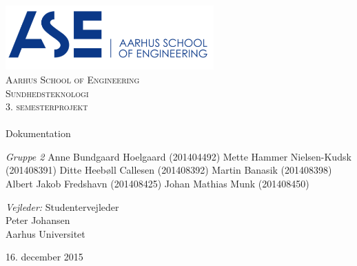 \begin{titlingpage}
\begin{center}

~ \\[3cm]

\includegraphics[width=0.6\textwidth]{figurer/ASE}~\\[1cm]

\textsc{\LARGE Aarhus School of Engineering}\\[1.5cm]

\textsc{\Large Sundhedsteknologi}\\
\textsc{\Large 3. semesterprojekt}\\[0.5cm]

\noindent\makebox[\linewidth]{\rule{\textwidth}{0.4pt}}\\
[0.5cm]{\Huge Dokumentation}
\noindent\makebox[\linewidth]{\rule{\textwidth}{0.4pt}}

\end{center}

\textit{Gruppe 2} \newline
Anne Bundgaard Hoelgaard \tab(201404492) \newline
Mette Hammer Nielsen-Kudsk  \tab(201408391) \newline	
Ditte Heebøll Callesen \tab(201408392) \newline
Martin Banasik  \tab(201408398) \newline	
Albert Jakob Fredshavn \tab(201408425) \newline 
Johan Mathias Munk  \tab(201408450) \newline


\textit{Vejleder:} \newline
Studentervejleder\\
Peter Johansen\\
Aarhus Universitet


\vfill

\begin{center}
{\large 16. december 2015}
\end{center}


\end{titlingpage}
